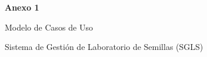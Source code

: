 \clearpage
\setcounter{subsection}{0}
\setcounter{subsubsection}{0}
\vspace*{3cm}
{\centering
{\Huge\bfseries Anexo 1\par}
\vspace{1cm}
{\LARGE Modelo de Casos de Uso\par}
\vspace{2cm}
{\large Sistema de Gestión de Laboratorio de Semillas (SGLS)\par}
\vfill
\par}
\clearpage
